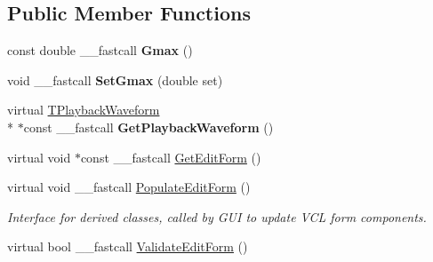 \subsection*{Public Member Functions}
\begin{DoxyCompactItemize}
\item 
\hypertarget{class_t_playback_current_ab502ccffe8273537850dab4790db79fd}{const double \+\_\+\+\_\+fastcall {\bfseries Gmax} ()}\label{class_t_playback_current_ab502ccffe8273537850dab4790db79fd}

\item 
\hypertarget{class_t_playback_current_a1f26dddfd2e5f46792d5112cb9e6ac67}{void \+\_\+\+\_\+fastcall {\bfseries Set\+Gmax} (double set)}\label{class_t_playback_current_a1f26dddfd2e5f46792d5112cb9e6ac67}

\item 
\hypertarget{class_t_playback_current_ab38a64219957c17687e2361def14324f}{virtual \hyperlink{class_t_playback_waveform}{T\+Playback\+Waveform} \\*
$\ast$const \+\_\+\+\_\+fastcall {\bfseries Get\+Playback\+Waveform} ()}\label{class_t_playback_current_ab38a64219957c17687e2361def14324f}

\item 
virtual void $\ast$const \+\_\+\+\_\+fastcall \hyperlink{class_t_playback_current_a28d0a767401ce8b53de441e83c6aae5c}{Get\+Edit\+Form} ()
\item 
\hypertarget{class_t_playback_current_aa5569339c8b6c425e67759b7be68d1d5}{virtual void \+\_\+\+\_\+fastcall \hyperlink{class_t_playback_current_aa5569339c8b6c425e67759b7be68d1d5}{Populate\+Edit\+Form} ()}\label{class_t_playback_current_aa5569339c8b6c425e67759b7be68d1d5}

\begin{DoxyCompactList}\small\item\em Interface for derived classes, called by G\+U\+I to update V\+C\+L form components. \end{DoxyCompactList}\item 
\hypertarget{class_t_playback_current_a0dad07f280f6bcdba5ac26675b0f4597}{virtual bool \+\_\+\+\_\+fastcall \hyperlink{class_t_playback_current_a0dad07f280f6bcdba5ac26675b0f4597}{Validate\+Edit\+Form} ()}\label{class_t_playback_current_a0dad07f280f6bcdba5ac26675b0f4597}


\end{DoxyCompactItemize}
